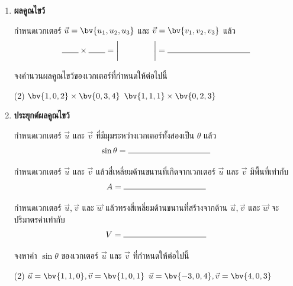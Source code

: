 \begin{enumerate}

\newpage
\item \textbf{ ผลคูณไขว้} 

กำหนดเวกเตอร์ $\vec{u} = \bv{u_1, u_2, u_3}$ และ $\vec{v} = \bv{v_1, v_2, v_3}$ แล้ว
\[\rule{20pt}{.5pt} \times \rule{20pt}{.5pt} = \begin{vmatrix} \hphantom{aaaaaaaa} \\  \\  \end{vmatrix} = \rule{100pt}{.5pt}\]

จงคำนวนผลคูณไขว้ของเวกเตอร์ที่กำหนดให้ต่อไปนี้
\begin{tasks}(2)
\task $\bv{1,0,2} \times \bv{0,3,4}$
\task $\bv{1,1,1} \times \bv{0,2,3}$
\end{tasks}
\vspace{100pt}

\item \textbf{ประยุกต์ผลคูณไขว้}

กำหนดเวกเตอร์ $\vec{u}$ และ $\vec{v}$ ที่มีมุมระหว่างเวกเตอร์ทั้งสองเป็น $\theta$ แล้ว
\[ \sin \theta =  \rule{100pt}{.5pt} \]  

กำหนดเวกเตอร์ $\vec{u}$ และ $\vec{v}$ แล้วสี่เหลี่ยมด้านขนานที่เกิดจากเวกเตอร์ $\vec{u}$ และ $\vec{v}$ มีพื้นที่เท่ากับ
\[A = \rule{100pt}{.5pt}\]

กำหนดเวกเตอร์ $\vec{u}, \vec{v}$ และ $\vec{w}$ แล้วทรงสี่เหลี่ยมด้านขนานที่สร้างจากด้าน $\vec{u}, \vec{v}$ และ $\vec{w}$ จะปริมาตรค่าเท่ากับ
\[V = \rule{100pt}{.5pt}\]


จงหาค่า $\sin \theta$ ของเวกเตอร์ $\vec{u}$ และ $\vec{v}$ ที่กำหนดให้ต่อไปนี้
\begin{tasks}(2)
\task $\vec{u} = \bv{1,1,0}, \vec{v} = \bv{1,0,1} $
\vspace{50pt}
\task $\vec{u} = \bv{-3,0,4}, \vec{v} = \bv{4,0,3} $
\end{tasks}
\end{enumerate}

